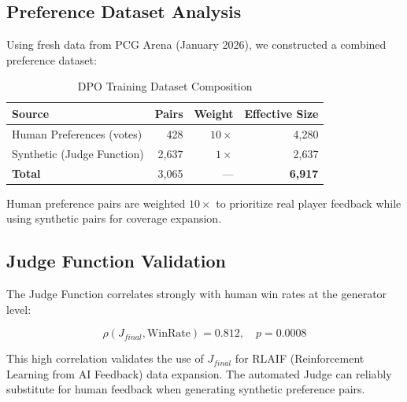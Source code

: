 \documentclass[11pt,a4paper]{article}
\theoremstyle{plain}
\theoremstyle{definition}
\theoremstyle{remark}
\begin{document}
\subsection{Preference Dataset Analysis}
\label{subsec:preference-dataset}

Using fresh data from PCG Arena (January 2026), we constructed a combined preference dataset:

\begin{table}[H]
\centering
\caption{DPO Training Dataset Composition}
\label{tab:dpo-dataset}
\begin{tabular}{lrrr}
\toprule
\textbf{Source} & \textbf{Pairs} & \textbf{Weight} & \textbf{Effective Size} \\
\midrule
Human Preferences (votes) & 428 & $10\times$ & 4,280 \\
Synthetic (Judge Function) & 2,637 & $1\times$ & 2,637 \\
\midrule
\textbf{Total} & 3,065 & --- & \textbf{6,917} \\
\bottomrule
\end{tabular}
\end{table}

Human preference pairs are weighted $10\times$ to prioritize real player feedback while using synthetic pairs for coverage expansion.

\subsection{Judge Function Validation}
\label{subsec:judge-validation}

The Judge Function correlates strongly with human win rates at the generator level:

\begin{equation}
\rho(J_{final}, \text{WinRate}) = 0.812, \quad p = 0.0008
\end{equation}

This high correlation validates the use of $J_{final}$ for RLAIF (Reinforcement Learning from AI Feedback) data expansion. The automated Judge can reliably substitute for human feedback when generating synthetic preference pairs.
\end{document}
